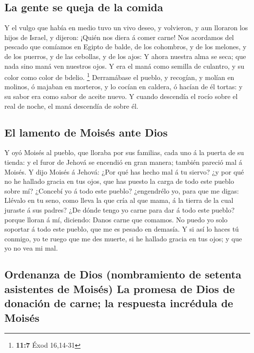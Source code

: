 \hypertarget{la-gente-se-queja-de-la-comida}{%
\subsection{La gente se queja de la
comida}\label{la-gente-se-queja-de-la-comida}}

 Y el vulgo que había en medio tuvo un vivo deseo, y
volvieron, y aun lloraron los hijos de Israel, y dijeron: ¡Quién nos
diera á comer carne!  Nos acordamos del pescado que comíamos
en Egipto de balde, de los cohombros, y de los melones, y de los
puerros, y de las cebollas, y de los ajos:  Y ahora nuestra
alma se seca; que nada sino maná ven nuestros ojos.  Y era
el maná como semilla de culantro, y su color como color de bdelio.
\footnote{\textbf{11:7} Éxod 16,14-31}  Derramábase el
pueblo, y recogían, y molían en molinos, ó majaban en morteros, y lo
cocían en caldera, ó hacían de él tortas: y su sabor era como sabor de
aceite nuevo.  Y cuando descendía el rocío sobre el real de
noche, el maná descendía de sobre él.

\hypertarget{el-lamento-de-moisuxe9s-ante-dios}{%
\subsection{El lamento de Moisés ante
Dios}\label{el-lamento-de-moisuxe9s-ante-dios}}

 Y oyó Moisés al pueblo, que lloraba por sus familias, cada
uno á la puerta de su tienda: y el furor de Jehová se encendió en gran
manera; también pareció mal á Moisés.  Y dijo Moisés á
Jehová: ¿Por qué has hecho mal á tu siervo? ¿y por qué no he hallado
gracia en tus ojos, que has puesto la carga de todo este pueblo sobre
mí?  ¿Concebí yo á todo este pueblo? ¿engendrélo yo, para
que me digas: Llévalo en tu seno, como lleva la que cría al que mama, á
la tierra de la cual juraste á sus padres?  ¿De dónde tengo
yo carne para dar á todo este pueblo? porque lloran á mí, diciendo:
Danos carne que comamos.  No puedo yo solo soportar á todo
este pueblo, que me es pesado en demasía.  Y si así lo
haces tú conmigo, yo te ruego que me des muerte, si he hallado gracia en
tus ojos; y que yo no vea mi mal.

\hypertarget{ordenanza-de-dios-nombramiento-de-setenta-asistentes-de-moisuxe9s-la-promesa-de-dios-de-donaciuxf3n-de-carne-la-respuesta-incruxe9dula-de-moisuxe9s}{%
\subsection{Ordenanza de Dios (nombramiento de setenta asistentes de
Moisés) La promesa de Dios de donación de carne; la respuesta incrédula
de
Moisés}\label{ordenanza-de-dios-nombramiento-de-setenta-asistentes-de-moisuxe9s-la-promesa-de-dios-de-donaciuxf3n-de-carne-la-respuesta-incruxe9dula-de-moisuxe9s}}

